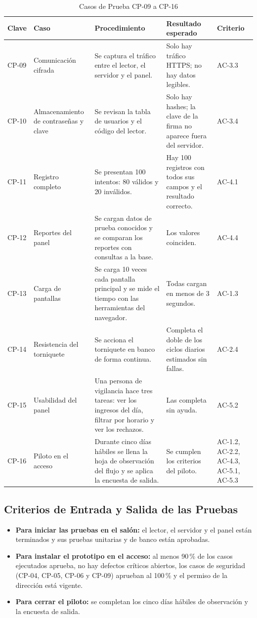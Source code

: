 \begin{table}[tbp]
	\caption{Casos de Prueba CP-09 a CP-16}
	\label{tab:cp2}
	\small\setlength{\tabcolsep}{3pt}
	\begin{tabular}{P{1.2cm}P{2.9cm}P{4.6cm}P{4.3cm}P{1.6cm}}
		\toprule
		Clave & Caso & Procedimiento & Resultado esperado & Criterio \\
		\midrule
		CP-09 & Comunicación cifrada & Se captura el tráfico entre el lector, el servidor y el panel. & Solo hay tráfico HTTPS; no hay datos legibles. & AC-3.3 \\
		CP-10 & Almacenamiento de contraseñas y clave & Se revisan la tabla de usuarios y el código del lector. & Solo hay hashes; la clave de la firma no aparece fuera del servidor. & AC-3.4 \\
		CP-11 & Registro completo & Se presentan 100 intentos: 80 válidos y 20 inválidos. & Hay 100 registros con todos sus campos y el resultado correcto. & AC-4.1 \\
		CP-12 & Reportes del panel & Se cargan datos de prueba conocidos y se comparan los reportes con consultas a la base. & Los valores coinciden. & AC-4.4 \\
		CP-13 & Carga de pantallas & Se carga 10 veces cada pantalla principal y se mide el tiempo con las herramientas del navegador. & Todas cargan en menos de 3 segundos. & AC-1.3 \\
		CP-14 & Resistencia del torniquete & Se acciona el torniquete en banco de forma continua. & Completa el doble de los ciclos diarios estimados sin fallas. & AC-2.4 \\
		CP-15 & Usabilidad del panel & Una persona de vigilancia hace tres tareas: ver los ingresos del día, filtrar por horario y ver los rechazos. & Las completa sin ayuda. & AC-5.2 \\
		CP-16 & Piloto en el acceso & Durante cinco días hábiles se llena la hoja de observación del flujo y se aplica la encuesta de salida. & Se cumplen los criterios del piloto. & AC-1.2, AC-2.2, AC-4.3, AC-5.1, AC-5.3 \\
		\bottomrule
	\end{tabular}
\end{table}

\subsection{Criterios de Entrada y Salida de las Pruebas}
\begin{itemize}
	\item \textbf{Para iniciar las pruebas en el salón:} el lector, el servidor
	      y el panel están terminados y sus pruebas unitarias y de banco están
	      aprobadas.
	\item \textbf{Para instalar el prototipo en el acceso:} al menos 90\,\% de
	      los casos ejecutados aprueba, no hay defectos críticos abiertos, los casos
	      de seguridad (CP-04, CP-05, CP-06 y CP-09) aprueban al 100\,\% y el permiso
	      de la dirección está vigente.
	\item \textbf{Para cerrar el piloto:} se completan los cinco días hábiles de
	      observación y la encuesta de salida.
\end{itemize}

